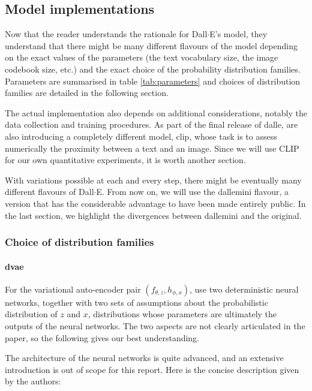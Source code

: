 \documentclass{article}
\begin{document}
\begin{multicols}{2}
\subsection{Model implementations}

Now that the reader understands the rationale for Dall$\cdot$E's model, they understand that there might be many different flavours of the model depending on the exact values of the parameters (the text vocabulary size, the image codebook size, etc.) and the exact choice of the probability distribution families. Parameters are summarised in table \ref{tab:parameters} and choices of distribution families are detailed in the following section.

The actual implementation also depends on additional considerations, notably the data collection and training procedures. As part of the final release of \gls{dalle}, \citeauthor{zeroshot} are also introducing a completely different model, \gls{clip}, whose task is to assess numerically the proximity between a text and an image. Since we will use CLIP for our own quantitative experiments, it is worth another section.

With variations possible at each and every step, there might be eventually many different flavours of Dall$\cdot$E. From now on, we will use the \gls{dallemini} flavour, a version that has the considerable advantage to have been made entirely public. In the last section, we highlight the divergences between \gls{dallemini} and the original.

\subsubsection{Choice of distribution families}

\paragraph{\gls{dvae}} \label{sec:dvae}

For the variational auto-encoder pair $(f_{\theta,z}, h_{\phi,x})$, \citeauthor{zeroshot} use two deterministic neural networks, together with two sets of assumptions about the probabilistic distribution of $z$ and $x$, distributions whose parameters are ultimately the outputs of the neural networks. The two aspects are not clearly articulated in the paper, so the following gives our best understanding.

The architecture of the neural networks is quite advanced, and an extensive introduction is out of scope for this report. Here is the concise description given by the authors:


\end{multicols}
\end{document}
